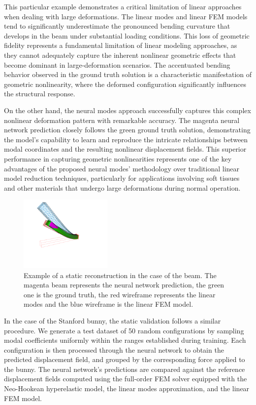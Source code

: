 This particular example demonstrates a critical limitation of linear approaches when dealing with large deformations. The linear modes and linear FEM models tend to significantly underestimate the pronounced bending curvature that develops in the beam under substantial loading conditions. This loss of geometric fidelity represents a fundamental limitation of linear modeling approaches, as they cannot adequately capture the inherent nonlinear geometric effects that become dominant in large-deformation scenarios. The accentuated bending behavior observed in the ground truth solution is a characteristic manifestation of geometric nonlinearity, where the deformed configuration significantly influences the structural response.

On the other hand, the neural modes approach successfully captures this complex nonlinear deformation pattern with remarkable accuracy. The magenta neural network prediction closely follows the green ground truth solution, demonstrating the model's capability to learn and reproduce the intricate relationships between modal coordinates and the resulting nonlinear displacement fields. This superior performance in capturing geometric nonlinearities represents one of the key advantages of the proposed neural modes' methodology over traditional linear model reduction techniques, particularly for applications involving soft tissues and other materials that undergo large deformations during normal operation.

\begin{figure}[ht]
    \centering
    \includegraphics[width=0.4\textwidth]{Images/sofa_example_beam.png}
    \caption{Example of a static reconstruction in the case of the beam. The magenta beam represents the neural network prediction, the green one is the ground truth, the red wireframe represents the linear modes and the blue wireframe is the linear FEM model.}
    \label{fig:static_rmse_distribution}
\end{figure}

In the case of the Stanford bunny, the static validation follows a similar procedure. We generate a test dataset of 50 random configurations by sampling modal coefficients uniformly within the ranges established during training. Each configuration is then processed through the neural network to obtain the predicted displacement field, and grouped by the corresponding force applied to the bunny. The neural network's predictions are compared against the reference displacement fields computed using the full-order FEM solver equipped with the Neo-Hookean hyperelastic model, the linear modes approximation, and the linear FEM model.


